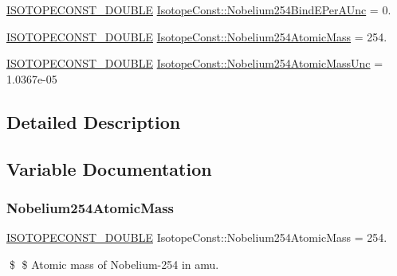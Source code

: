 \begin{DoxyCompactItemize}
\mbox{\hyperlink{group___isotope_const-_macros_ga8f45a7272ce02c0b4c65c44636ed719a}{I\+S\+O\+T\+O\+P\+E\+C\+O\+N\+S\+T\+\_\+\+D\+O\+U\+B\+LE}} \mbox{\hyperlink{group___isotope_const-_nobelium-_no254_ga5ba0c2fe0bd55eaa91ab8c95fdc79b14}{Isotope\+Const\+::\+Nobelium254\+Bind\+E\+Per\+A\+Unc}} = 0.
\item 
\mbox{\hyperlink{group___isotope_const-_macros_ga8f45a7272ce02c0b4c65c44636ed719a}{I\+S\+O\+T\+O\+P\+E\+C\+O\+N\+S\+T\+\_\+\+D\+O\+U\+B\+LE}} \mbox{\hyperlink{group___isotope_const-_nobelium-_no254_ga6850004b2559c86b868ec21211b98a2f}{Isotope\+Const\+::\+Nobelium254\+Atomic\+Mass}} = 254.
\item 
\mbox{\hyperlink{group___isotope_const-_macros_ga8f45a7272ce02c0b4c65c44636ed719a}{I\+S\+O\+T\+O\+P\+E\+C\+O\+N\+S\+T\+\_\+\+D\+O\+U\+B\+LE}} \mbox{\hyperlink{group___isotope_const-_nobelium-_no254_gaf221fcfb908dfa6a2b686831bed75418}{Isotope\+Const\+::\+Nobelium254\+Atomic\+Mass\+Unc}} = 1.\+0367e-\/05
\end{DoxyCompactItemize}


\subsection{Detailed Description}


\subsection{Variable Documentation}
\mbox{\label{group___isotope_const-_nobelium-_no254_ga6850004b2559c86b868ec21211b98a2f}} 
\subsubsection{\texorpdfstring{Nobelium254\+Atomic\+Mass}{Nobelium254AtomicMass}}
{\footnotesize\ttfamily \mbox{\hyperlink{group___isotope_const-_macros_ga8f45a7272ce02c0b4c65c44636ed719a}{I\+S\+O\+T\+O\+P\+E\+C\+O\+N\+S\+T\+\_\+\+D\+O\+U\+B\+LE}} Isotope\+Const\+::\+Nobelium254\+Atomic\+Mass = 254.}

\$ \$ Atomic mass of Nobelium-\/254 in amu. \mbox{\label{group___isotope_const-_nobelium-_no254_gaf221fcfb908dfa6a2b686831bed75418}} 
